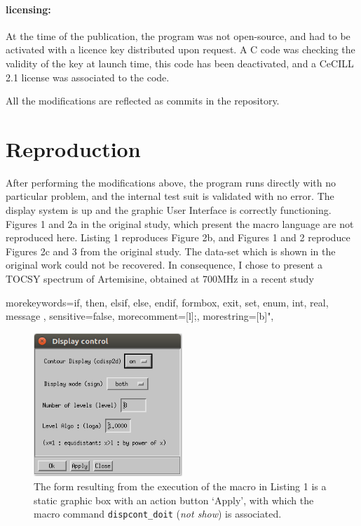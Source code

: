 \paragraph{licensing:} At the time of the publication, the program was not
open-source, and had to be activated with a licence key distributed upon
request. A C code was checking the validity of the key at launch time,
this code has been deactivated, and a CeCILL 2.1 license \cite{CeCILL} was associated
to the code.

All the modifications are reflected as commits in the repository.

\hypertarget{reproduction}{%
\section{Reproduction}\label{reproduction}}

After performing the modifications above, the program runs directly with
no particular problem, and the internal test suit is validated with no
error. The display system is up and the graphic User Interface is
correctly functioning. Figures 1 and 2a in the original study, which
present the macro language are not reproduced here. Listing 1 reproduces
Figure 2b, and Figures 1 and 2 reproduce Figures 2c and 3 from the
original study. The data-set which is shown in the original work could
not be recovered. In consequence, I chose to present a TOCSY spectrum of
Artemisine, obtained at 700MHz in a recent study \cite{Margueritte_2018}


    {morekeywords={if, then, elsif, else, endif, formbox, exit, set, enum, int, real, message },
    sensitive=false,
    morecomment=[l]{;},
    morestring=[b]",
    }

\lstset{ %
    basicstyle=\small,
    keywordstyle=\bfseries
    }


\begin{figure}
\centering
\includegraphics[width=0.5\textwidth]{figure2c.png}
\caption{The form resulting from the execution of the macro in Listing 1
is a static graphic box with an action button `Apply', with which the
macro command \texttt{dispcont\_doit} (\emph{not show}) is associated.}
\end{figure}

